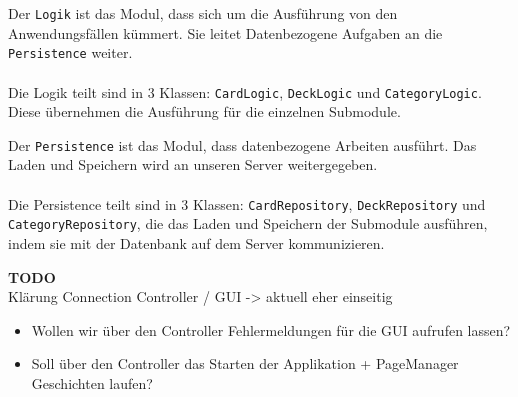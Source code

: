 \documentclass[fontsize=12pt,paper=A4,twoside]{scrartcl}
\begin{document}
    Der \texttt{Logik} ist das Modul, dass sich um die Ausführung von den Anwendungsfällen kümmert.
    Sie leitet Datenbezogene Aufgaben an die \texttt{Persistence} weiter.\\\\
    Die Logik teilt sind in 3 Klassen: \texttt{CardLogic}, \texttt{DeckLogic} und \texttt{CategoryLogic}. Diese übernehmen
    die Ausführung für die einzelnen Submodule.

    Der \texttt{Persistence} ist das Modul, dass datenbezogene Arbeiten ausführt. Das Laden und Speichern wird
    an unseren Server weitergegeben.\\\\
    Die Persistence teilt sind in 3 Klassen: \texttt{CardRepository}, \texttt{DeckRepository} und \texttt{CategoryRepository}, die das Laden und Speichern der
    Submodule ausführen, indem sie mit der Datenbank auf dem Server kommunizieren.


    \textbf{TODO}\\
    Klärung Connection Controller / GUI -> aktuell eher einseitig
    \begin{itemize}
    \item Wollen wir über den Controller Fehlermeldungen für die GUI
    aufrufen lassen?
    \item Soll über den Controller das Starten der Applikation + PageManager Geschichten laufen?
    \end{itemize}
\end{document}
